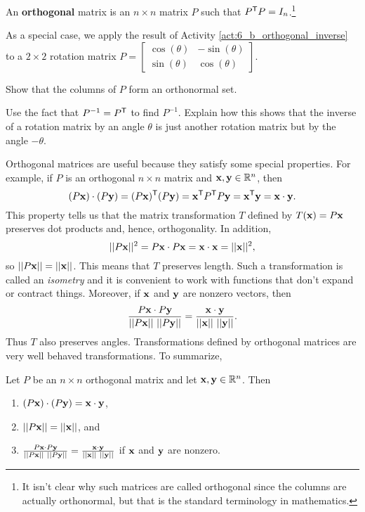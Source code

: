 \begin{definition} An \textbf{orthogonal} matrix is an $n \times n$ matrix $P$ such that $P^{\mathsf{T}}P = I_n$.\footnote{It isn't clear why such matrices are called orthogonal since the columns are actually orthonormal, but that is the standard terminology in mathematics.}
\end{definition}

\begin{activity} As a special case, we apply the result of Activity \ref{act:6_b_orthogonal_inverse} to a $2 \times 2$ rotation matrix $P = \left[ \begin{array}{cr} \cos(\theta) &-\sin(\theta) \\ \sin(\theta) &\cos(\theta) \end{array} \right]$.
	\ba
	\item Show that the columns of $P$ form an orthonormal set.

	\item Use the fact that $P^{-1} = P^{\mathsf{T}}$ to find $P^{-1}$. Explain how this shows that the inverse of a rotation matrix by an angle $\theta$ is just another rotation matrix but by the angle $-\theta$.  
		
	\ea

\end{activity}

Orthogonal matrices are useful because they satisfy some special properties. For example, if $P$ is an orthogonal $n \times n$ matrix and $\mathbf{x}, \mathbf{y} \in \mathbb{R}^n$, then
\[(P\mathbf{x}) \cdot (P\mathbf{y}) = (P\mathbf{x})^{\mathsf{T}}(P\mathbf{y}) = \mathbf{x}^{\mathsf{T}}P^{\mathsf{T}}P\mathbf{y} = \mathbf{x}^{\mathsf{T}}\mathbf{y} = \mathbf{x} \cdot \mathbf{y}.\]
This property tells us that the matrix transformation $T$ defined by $T(\mathbf{x}) = P\mathbf{x}$ preserves dot products and, hence, orthogonality. In addition,
\[||P\mathbf{x}||^2 = P\mathbf{x} \cdot P\mathbf{x} = \mathbf{x} \cdot \mathbf{x} = ||\mathbf{x}||^2,\]
so $||P\mathbf{x}|| = ||\mathbf{x}||$. This means that $T$ preserves length. Such a transformation is called an \emph{isometry} and it is convenient to work with functions that don't expand or contract things. Moreover, if $\mathbf{x}$ and $\mathbf{y}$ are nonzero vectors, then
\[\frac{P\mathbf{x} \cdot P\mathbf{y}}{||P\mathbf{x}|| \ ||P\mathbf{y}||} = \frac{\mathbf{x} \cdot \mathbf{y}}{||\mathbf{x}|| \ ||\mathbf{y}||}.\]
Thus $T$ also preserves angles. Transformations defined by orthogonal matrices are very well behaved transformations. To summarize,

\begin{theorem} Let $P$ be an $n \times n$ orthogonal matrix and let $\mathbf{x}, \mathbf{y} \in \mathbb{R}^n$. Then
\begin{enumerate}
\item $(P\mathbf{x}) \cdot (P\mathbf{y}) = \mathbf{x} \cdot \mathbf{y}$,
\item $||P\mathbf{x}|| = ||\mathbf{x}||$, and
\item $\frac{P\vx \cdot P\vy}{||P\vx|| \ ||P\vy||} = \frac{\vx \cdot \vy}{||\vx|| \ ||\vy||}$ if $\mathbf{x}$ and $\mathbf{y}$ are nonzero.
\end{enumerate}
\end{theorem}

